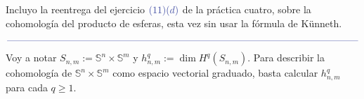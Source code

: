 \documentclass[11pt]{article}
\title{
\LARGE{\paint{Geometr\'ia Diferencial}}
\\
\vspace{0.5pt}
\small{\paint{}}
}
\author{\paint{Guido Arnone}}
\date{}
\newcommand{\Ss}{\mathbb{S}}
\newcommand{\paint}[1]{\color{color}{#1}}
\begin{document}
\maketitle

Incluyo la reentrega del ejercicio $\paint{(11)(d)}$ de la práctica cuatro, sobre la cohomología del producto de esferas, esta vez sin usar la fórmula de Künneth.

\begin{center}
$\paint{
\rule{400pt}{0.5pt}
}$
\vspace{25pt}
\end{center}


Voy a notar $S_{n,m} := \Ss^n \times \Ss^m$ y $h^q_{n,m} := \dim H^q(S_{n,m})$. Para describir la cohomología de $\Ss^n \times \Ss^m$ como espacio vectorial graduado, basta calcular $h^q_{n,m}$ para cada $q \geq 1$.
\end{document}
